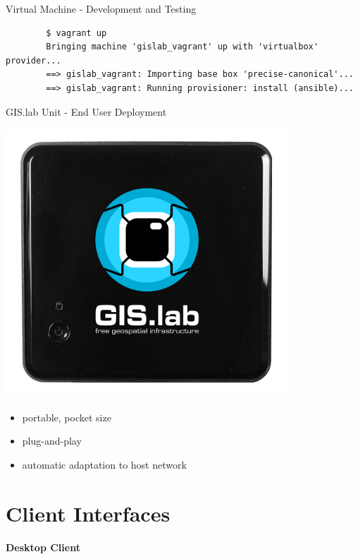 \documentclass[12pt]{beamer}
\begin{document}
\begin{frame}[fragile]{Virtual Machine - Development and Testing}
   \lstset{language=sh}
	\begin{lstlisting}
		$ vagrant up
		Bringing machine 'gislab_vagrant' up with 'virtualbox' provider...
		==> gislab_vagrant: Importing base box 'precise-canonical'...
		==> gislab_vagrant: Running provisioner: install (ansible)...
	\end{lstlisting}
\end{frame}

\begin{frame}{GIS.lab Unit - End User Deployment}
	\begin{center}
		\includegraphics[keepaspectratio=true,height=0.5\textheight]{images/gislab-unit.png}
	\end{center}
	\begin{itemize}
		\item portable, pocket size
		\item plug-and-play
		\item automatic adaptation to host network
	\end{itemize}
\end{frame}


\section{Client Interfaces}
\begin{frame}
	\begin{center}
		\LARGE\textbf{Desktop Client}	
	\end{center}
\end{frame}
\end{document}
